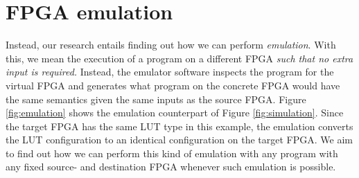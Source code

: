 \section{FPGA emulation}
Instead, our research entails finding out how we can perform \textit{emulation}. With this, we mean the execution of a program on a different FPGA \textit{such that no extra input is required.} Instead, the emulator software inspects the program for the virtual FPGA and generates what program on the concrete FPGA would have the same semantics given the same inputs as the source FPGA. Figure \ref{fig:emulation} shows the emulation counterpart of Figure \ref{fig:simulation}. Since the target FPGA has the same LUT type in this example, the emulation converts the LUT configuration to an identical configuration on the target FPGA. We aim to find out how we can perform this kind of emulation with any program with any fixed source- and destination FPGA whenever such emulation is possible.
